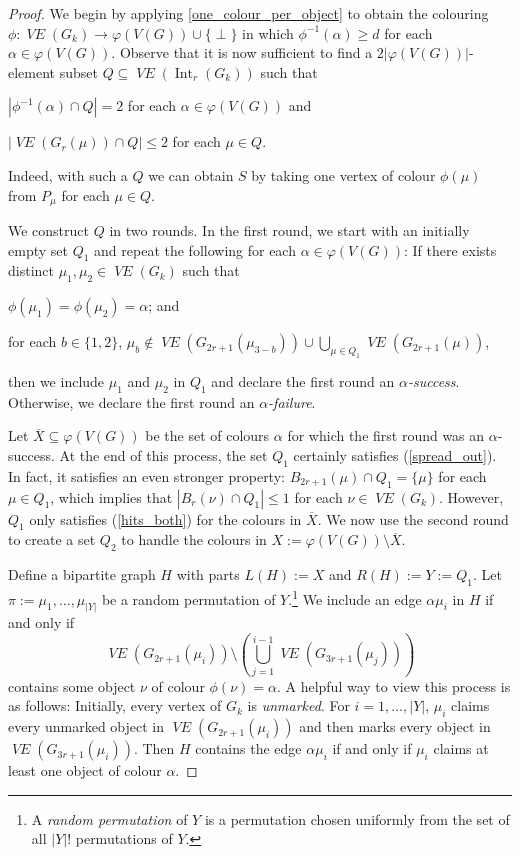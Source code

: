 \documentclass{patmorin}
\DeclareMathOperator{\interior}{Int}
\newcommand{\defin}[1]{\emph{\color{brightmaroon}#1}}
\DeclareMathOperator{\VE}{\mathit{VE}}
\begin{document}
\begin{proof}
  We begin by applying \cref{one_colour_per_object} to obtain the colouring $\phi:\VE(G_k)\to\varphi(V(G))\cup\{\perp\}$ in which $\phi^{-1}(\alpha)\ge d$ for each $\alpha\in\varphi(V(G))$.  Observe that it is now sufficient to find a $2|\varphi(V(G))|$-element subset $Q\subseteq\VE(\interior_r(G_k))$ such that
  \begin{compactenum}[(i)]
    \item $|\phi^{-1}(\alpha)\cap Q|= 2$ for each $\alpha\in\varphi(V(G))$ and
    \item $|\VE(G_r(\mu))\cap Q|\le 2$ for each $\mu\in Q$.
  \end{compactenum}
  Indeed, with such a $Q$ we can obtain $S$ by taking one vertex of colour $\phi(\mu)$ from $P_\mu$ for each $\mu\in Q$.

  We construct $Q$ in two rounds.  In the first round, we start with an initially empty set $Q_1$ and repeat the following for each $\alpha\in\varphi(V(G))$:
  If there exists distinct $\mu_1,\mu_2\in\VE(G_k)$ such that
  \begin{compactenum}[(a)]
    \item $\phi(\mu_1)=\phi(\mu_2)=\alpha$; and\label{hits_both_q}
    \item for each $b\in\{1,2\}$, $\mu_b\not\in \VE(G_{2r+1}(\mu_{3-b})) \cup \bigcup_{\mu\in Q_1} \VE(G_{2r+1}(\mu))$,\label{spread_out_q}
  \end{compactenum}
  then we include $\mu_1$ and $\mu_2$ in $Q_1$ and declare the first round an \defin{$\alpha$-success}.  Otherwise, we declare the first round an \defin{$\alpha$-failure}.

  Let $\overline{X}\subseteq\varphi(V(G))$ be the set of colours $\alpha$ for which the first round was an $\alpha$-success. At the end of this process, the set $Q_1$ certainly satisfies (\ref{spread_out}).  In fact, it satisfies an even stronger property: $B_{2r+1}(\mu)\cap Q_1=\{\mu\}$ for each $\mu\in Q_1$, which implies that $|B_r(\nu)\cap Q_1|\le 1$ for each $\nu\in\VE(G_k)$. However, $Q_1$ only satisfies (\ref{hits_both}) for the colours in $\overline{X}$.  We now use the second round to create a set $Q_2$ to handle the colours in $X:=\varphi(V(G))\setminus \overline{X}$.

  Define a bipartite graph $H$ with parts $L(H):=X$ and $R(H):=Y:=Q_1$.  Let $\pi:=\mu_1,\ldots,\mu_{|Y|}$ be a random permutation of $Y$.\footnote{A \defin{random permutation} of $Y$ is a permutation chosen uniformly from the set of all $|Y|!$ permutations of $Y$.}  We include an edge $\alpha\mu_i$ in $H$ if and only if
  \[
    \VE(G_{2r+1}(\mu_i))\setminus\left(\bigcup_{j=1}^{i-1}\VE(G_{3r+1}(\mu_j))\right)
  \]
  contains some object $\nu$ of colour $\phi(\nu)=\alpha$.  A helpful way to view this process is as follows: Initially, every vertex of $G_k$ is \defin{unmarked}.  For $i=1,\ldots,|Y|$, $\mu_i$ claims every unmarked object in $\VE(G_{2r+1}(\mu_i))$ and then marks every object in $\VE(G_{3r+1}(\mu_i))$. Then $H$ contains the edge $\alpha\mu_i$ if and only if $\mu_i$ claims at least one object of colour $\alpha$.


\end{proof}
\end{document}
